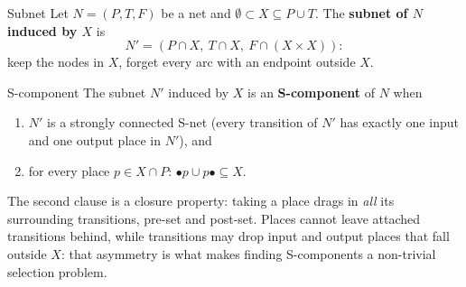 \begin{definitionbox}{Subnet}
Let $N = (P, T, F)$ be a net and $\emptyset \subset X \subseteq P \cup T$. The \textbf{subnet of $N$ induced by $X$} is
$$N' = (P \cap X,\ T \cap X,\ F \cap (X \times X)):$$
keep the nodes in $X$, forget every arc with an endpoint outside $X$.
\end{definitionbox}
\begin{definitionbox}{S-component}
The subnet $N'$ induced by $X$ is an \textbf{S-component} of $N$ when
\begin{enumerate}
  \item $N'$ is a strongly connected S-net (every transition of $N'$ has exactly one input and one output place in $N'$), and
  \item for every place $p \in X \cap P$: $\bullet p \cup p \bullet \subseteq X$.
\end{enumerate}
\end{definitionbox}
The second clause is a closure property: taking a place drags in \emph{all} its surrounding transitions, pre-set and post-set. Places cannot leave attached transitions behind, while transitions may drop input and output places that fall outside $X$: that asymmetry is what makes finding S-components a non-trivial selection problem.

